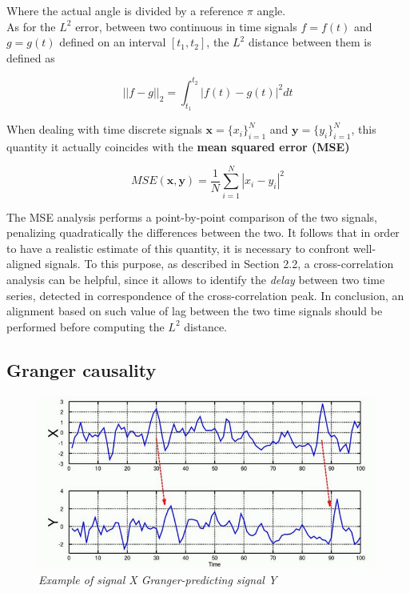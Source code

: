 \documentclass[a4paper]{article}
\begin{document}
Where the actual angle is divided by a reference $\pi$ angle.
\\
As for the $L^2$ error, between two continuous in time signals $f = f(t)$ and $g = g(t)$ defined on an interval $[t_1,t_2]$, the $L^2$ distance between them is defined as 

$$ ||f-g||_2 = \int_{t_1}^{t_2}|f(t) - g(t)|^2 dt $$

When dealing with time discrete signals $ \textbf{x} = \{x_i\}_{i=1}^N$ and  $\textbf{y} = \{y_i\}_{i=1}^N$, this quantity it actually coincides with the \textbf{mean squared error (MSE)}

$$ MSE(\textbf{x},\textbf{y}) = \frac{1}{N}\sum_{i=1}^{N}|x_i-y_i|^2 $$


The MSE analysis performs a point-by-point comparison of the two signals, penalizing quadratically the differences between the two. It follows that in order to have a realistic estimate of this quantity, it is necessary to confront well-aligned signals. To this purpose, as described in Section 2.2, a cross-correlation analysis can be helpful, since it allows to identify the \textit{delay} between two time series, detected in correspondence of the cross-correlation peak. In conclusion, an alignment based on such value of lag between the two time signals should be performed before computing the $L^2$ distance.



\subsection{Granger causality}


\begin{figure}[H]
	\begin{center}
		\hspace*{-1cm}
		\includegraphics[scale=.60]{GC.png} 
	\end{center} 
	\caption{\textit{Example of signal X Granger-predicting signal Y }}
	
\end{figure}
\end{document}
